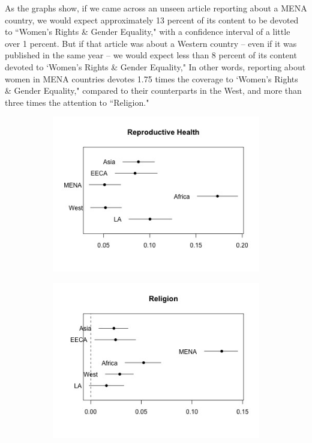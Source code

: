 \documentclass[11pt, oneside]{article}
\begin{document}
As the graphs show, if we came across an unseen article reporting about a MENA country, we would expect approximately 13 percent of its content to be devoted to ``Women's Rights \& Gender Equality," with a confidence interval of a little over 1 percent.  But if that article was about a Western country -- even if it was published in the same year -- we would expect less than 8 percent of its content devoted to `Women's Rights \& Gender Equality," In other words, reporting about women in MENA countries devotes 1.75 times the coverage to `Women's Rights \& Gender Equality," compared to their counterparts in the West, and more than three times the attention to ``Religion."

\begin{figure}
\begin{subfigure}{.5\textwidth}
  \centering
  \includegraphics[width=1\linewidth]{2}
  \label{fig:sfig1}
\end{subfigure}%
\begin{subfigure}{.5\textwidth}
  \centering
  \includegraphics[width=1\linewidth]{3}

\end{subfigure}
\end{figure}
\end{document}
